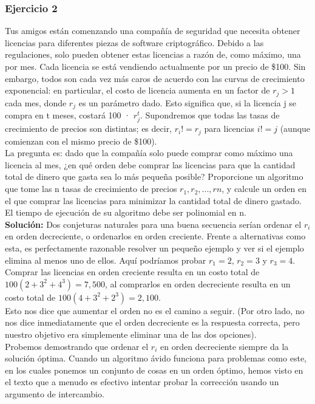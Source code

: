 \documentclass[a4paper, 12pt]{book}
\theoremstyle{dotless}
\begin{document}
\subsubsection{Ejercicio 2}

Tus amigos están comenzando una compañía de seguridad que necesita obtener licencias para diferentes piezas de software criptográfico. Debido a las regulaciones, solo pueden obtener estas licencias a razón de, como máximo, una por mes. Cada licencia se está vendiendo actualmente por un precio de \$100. Sin embargo, todos son cada vez más caros de acuerdo con las curvas de crecimiento exponencial: en particular, el costo de licencia aumenta en un factor de $r_j>1$ cada mes, donde $r_j$ es un parámetro dado. Esto significa que, si la licencia j se compra en t meses, costará 100 · $r^t_j$. Supondremos que todas las tasas de crecimiento de precios son distintas; es decir, $r_i != r_j$ para licencias $i != j$ (aunque comienzan con el mismo precio de \$100).\\

La pregunta es: dado que la compañía solo puede comprar como máximo una licencia al mes, ¿en qué orden debe comprar las licencias para que la cantidad total de dinero que gasta sea lo más pequeña posible? Proporcione un algoritmo que tome las n tasas de crecimiento de precios $r_1,r_2,...,rn$, y calcule un orden en el que comprar las licencias para minimizar la cantidad total de dinero gastado. El tiempo de ejecución de su algoritmo debe ser polinomial en n.\\

\textbf{Solución:} Dos conjeturas naturales para una buena secuencia serían ordenar el $r_i$ en orden decreciente, o ordenarlos en orden creciente. Frente a alternativas como esta, es perfectamente razonable resolver un pequeño ejemplo y ver si el ejemplo elimina al menos uno de ellos. Aquí podríamos probar $r_1=2$, $r_2=3$ y $r_3=4$. Comprar las licencias en orden creciente resulta en un costo total de $100(2+3^2+4^3) =7,500$, al comprarlos en orden decreciente resulta en un costo total de $100(4+3^2+2^3)=2,100$.\\

Esto nos dice que aumentar el orden no es el camino a seguir. (Por otro lado, no nos dice inmediatamente que el orden decreciente es la respuesta correcta, pero nuestro objetivo era simplemente eliminar una de las dos opciones).\\

 Probemos demostrando que ordenar el $r_i$ en orden decreciente siempre da la solución óptima. Cuando un algoritmo ávido funciona para problemas como este, en los cuales ponemos un conjunto de cosas en un orden óptimo, hemos visto en el texto que a menudo es efectivo intentar probar la corrección usando un argumento de intercambio.\\
 
\end{document}
